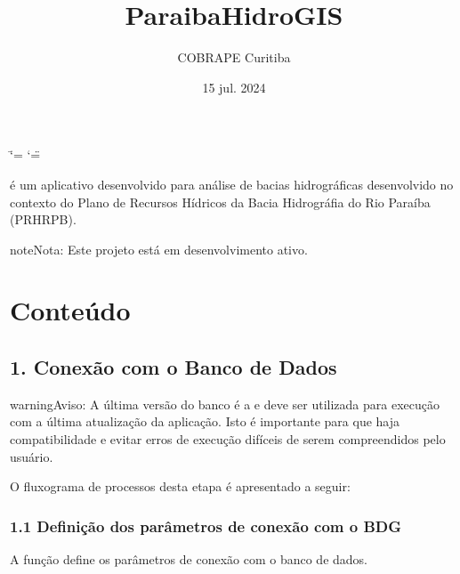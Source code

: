 \documentclass[a4paper,10pt,brazil]{sphinxmanual}
\title{ParaibaHidroGIS}
\date{15 jul. 2024}
\author{COBRAPE Curitiba}
\begin{document}
\ifdefined\shorthandoff
  \ifnum\catcode`\=\string=\active\shorthandoff{=}\fi
  \ifnum\catcode`\"=\active{}\fi
\fi

\pagestyle{empty}
\sphinxmaketitle
\pagestyle{plain}
\sphinxtableofcontents
\pagestyle{normal}
\label{\detokenize{index::doc}}


\sphinxAtStartPar
{} é um aplicativo desenvolvido para análise de bacias hidrográficas desenvolvido no contexto do Plano de Recursos Hídricos da Bacia Hidrográfia do Rio Paraíba (PRH\sphinxhyphen{}RPB).

\begin{sphinxadmonition}{note}{Nota:}
\sphinxAtStartPar
Este projeto está em desenvolvimento ativo.
\end{sphinxadmonition}


\chapter{Conteúdo}
\label{\detokenize{index:conteudo}}
\sphinxstepscope


\section{1. Conexão com o Banco de Dados}
\label{\detokenize{1conexaoBancoDados:conexao-com-o-banco-de-dados}}\label{\detokenize{1conexaoBancoDados::doc}}
\begin{sphinxadmonition}{warning}{Aviso:}
\sphinxAtStartPar
A última versão do banco é a  e deve ser utilizada para execução com a última atualização da aplicação. Isto é importante para que haja compatibilidade e evitar erros de execução difíceis de serem compreendidos pelo usuário.
\end{sphinxadmonition}

\sphinxAtStartPar
O fluxograma de processos desta etapa é apresentado a seguir:



\subsection{1.1 Definição dos parâmetros de conexão com o BDG}
\label{\detokenize{1conexaoBancoDados:definicao-dos-parametros-de-conexao-com-o-bdg}}
\sphinxAtStartPar
A função  define os parâmetros de conexão  com o banco de dados.
\end{document}
